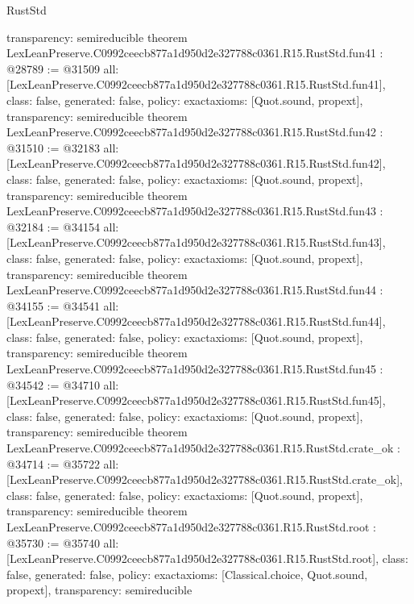 \begin{lexlean}{RustStd}
\begin{coremodule}
{  transparency: semireducible
}
theorem LexLeanPreserve.C0992ceecb877a1d950d2e327788c0361.R15.RustStd.fun41 : @28789 := @31509 {
  all: [LexLeanPreserve.C0992ceecb877a1d950d2e327788c0361.R15.RustStd.fun41],
  class: false,
  generated: false,
  policy: exact{axioms: [Quot.sound, propext]},
  transparency: semireducible
}
theorem LexLeanPreserve.C0992ceecb877a1d950d2e327788c0361.R15.RustStd.fun42 : @31510 := @32183 {
  all: [LexLeanPreserve.C0992ceecb877a1d950d2e327788c0361.R15.RustStd.fun42],
  class: false,
  generated: false,
  policy: exact{axioms: [Quot.sound, propext]},
  transparency: semireducible
}
theorem LexLeanPreserve.C0992ceecb877a1d950d2e327788c0361.R15.RustStd.fun43 : @32184 := @34154 {
  all: [LexLeanPreserve.C0992ceecb877a1d950d2e327788c0361.R15.RustStd.fun43],
  class: false,
  generated: false,
  policy: exact{axioms: [Quot.sound, propext]},
  transparency: semireducible
}
theorem LexLeanPreserve.C0992ceecb877a1d950d2e327788c0361.R15.RustStd.fun44 : @34155 := @34541 {
  all: [LexLeanPreserve.C0992ceecb877a1d950d2e327788c0361.R15.RustStd.fun44],
  class: false,
  generated: false,
  policy: exact{axioms: [Quot.sound, propext]},
  transparency: semireducible
}
theorem LexLeanPreserve.C0992ceecb877a1d950d2e327788c0361.R15.RustStd.fun45 : @34542 := @34710 {
  all: [LexLeanPreserve.C0992ceecb877a1d950d2e327788c0361.R15.RustStd.fun45],
  class: false,
  generated: false,
  policy: exact{axioms: [Quot.sound, propext]},
  transparency: semireducible
}
theorem LexLeanPreserve.C0992ceecb877a1d950d2e327788c0361.R15.RustStd.crate_ok : @34714 := @35722 {
  all: [LexLeanPreserve.C0992ceecb877a1d950d2e327788c0361.R15.RustStd.crate_ok],
  class: false,
  generated: false,
  policy: exact{axioms: [Quot.sound, propext]},
  transparency: semireducible
}
theorem LexLeanPreserve.C0992ceecb877a1d950d2e327788c0361.R15.RustStd.root : @35730 := @35740 {
  all: [LexLeanPreserve.C0992ceecb877a1d950d2e327788c0361.R15.RustStd.root],
  class: false,
  generated: false,
  policy: exact{axioms: [Classical.choice, Quot.sound, propext]},
  transparency: semireducible
}


\end{coremodule}
\end{lexlean}
